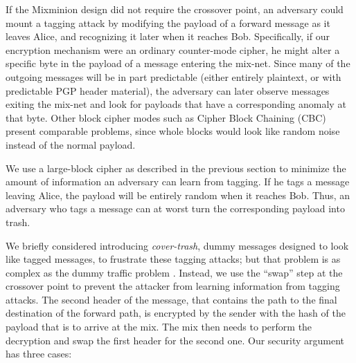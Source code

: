 \documentclass[11pt]{IEEEtran}
\begin{document}
If the Mixminion design did not require
the crossover point, an adversary could mount a tagging
attack by modifying the payload of a forward message as
it leaves Alice, and recognizing it later when it reaches Bob.
Specifically, if our encryption mechanism were an ordinary
counter-mode cipher, he might alter a specific byte in the payload of
a message entering the mix-net. Since many of the outgoing messages
will be in part predictable (either entirely plaintext, or with
predictable PGP header material), the adversary can later observe
messages exiting the mix-net and look for payloads that have a
corresponding anomaly at that byte. Other block cipher modes such as
Cipher Block Chaining (CBC) present comparable problems, since whole
blocks would look like random noise instead of the normal payload.

We use a large-block cipher as described in the previous section to
minimize the amount of information an adversary can learn from tagging.
If he tags a message
leaving Alice, the payload will be entirely random when it reaches
Bob.  Thus, an adversary who tags a message can at worst turn the
corresponding payload into trash.  

We briefly considered introducing \emph{cover-trash}, dummy messages
designed to look like tagged messages, to frustrate
these tagging attacks; but that problem is as complex as the dummy
traffic problem \cite{langos02}. Instead, we use the
``swap'' step at the
crossover point to prevent the attacker from learning information from
tagging attacks. The second header of the message, that contains the
path to the final destination of the forward path, is encrypted by the
sender with the hash of the payload that is to arrive at the mix. The
mix then needs to perform the decryption and swap the first header for
the second one.
Our security argument has three cases:
\end{document}
